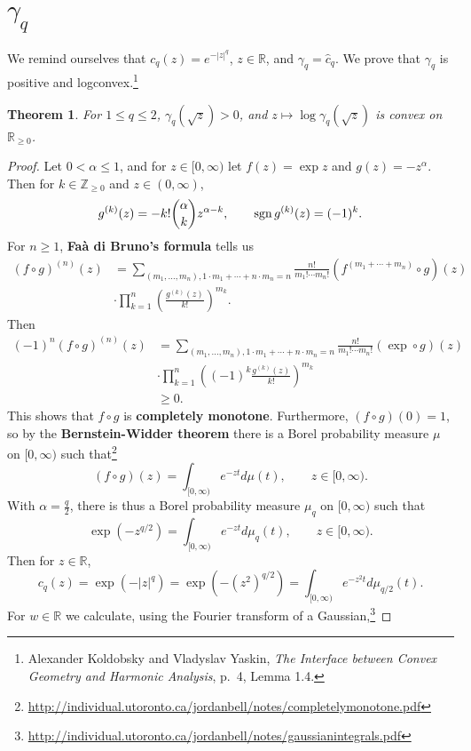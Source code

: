 \documentclass{article}
\newcommand{\sgn}{\ensuremath\mathrm{sgn}\,}
\newtheorem{theorem}{Theorem}
\theoremstyle{definition}
\begin{document}
\section{$\gamma_q$}
We remind ourselves that
$c_q(z) = e^{-|z|^q}$, $z \in \mathbb{R}$, 
and  $\gamma_q = \widehat{c}_q$.
We prove that $\gamma_q$ is positive and logconvex.\footnote{Alexander Koldobsky and
Vladyslav Yaskin, {\em The Interface between Convex Geometry and Harmonic Analysis},
p.~4, Lemma 1.4.}

\begin{theorem}
For $1 \leq q \leq 2$, $\gamma_q (\sqrt{z}) > 0$, and
$z \mapsto \log \gamma_q (\sqrt{z})$
is convex on $\mathbb{R}_{\geq 0}$.  
\end{theorem}
\begin{proof}
Let $0<\alpha \leq 1$, and for $z \in [0,\infty)$ let
 $f(z) = \exp z$ and $g(z) = -z^\alpha$. Then for $k \in \mathbb{Z}_{\geq 0}$ and
$z \in (0,\infty)$,
\[
g^{(k)}(z) = -k! \binom{\alpha}{k} z^{\alpha-k},
\qquad \sgn g^{(k)}(z) = (-1)^k.
\]
For $n \geq 1$,
\textbf{Fa\`a di Bruno's formula} tells us
\begin{align*}
(f \circ g)^{(n)}(z) &= \sum_{(m_1,\ldots,m_n), 1\cdot m_1+\cdots+n \cdot m_n=n} \frac{n!}{m_1! \cdots m_n!} (f^{(m_1+\cdots+m_n)} 
\circ g)(z)\\
& \cdot \prod_{k=1}^n \left( \frac{g^{(k)}(z)}{k!} \right)^{m_k}.
\end{align*}
Then 
\begin{align*}
(-1)^n (f \circ g)^{(n)}(z) &= \sum_{(m_1,\ldots,m_n), 1\cdot m_1+\cdots+n \cdot m_n=n} \frac{n!}{m_1! \cdots m_n!} 
(\exp \circ g)(z)\\
&\cdot  \prod_{k=1}^n \left( (-1)^k \frac{ g^{(k)}(z)}{k!} \right)^{m_k}\\
&\geq 0.
\end{align*}
This shows that $f \circ g$ is \textbf{completely monotone}. Furthermore,
$(f \circ g)(0) = 1$, so by the \textbf{Bernstein-Widder theorem}
there is a Borel probability measure $\mu$ on $[0,\infty)$ such that\footnote{\url{http://individual.utoronto.ca/jordanbell/notes/completelymonotone.pdf}}
\[
(f \circ g)(z) = \int_{[0,\infty)} e^{-zt} d\mu(t),\qquad z \in [0,\infty).
\]
With $\alpha= \frac{q}{2}$, there is thus a Borel probability measure $\mu_q$ on $[0,\infty)$ 
such that
\[
\exp(-z^{q/2}) = \int_{[0,\infty)} e^{-zt} d\mu_q(t),\qquad z \in [0,\infty).
\]
Then for $z \in \mathbb{R}$,
\[
c_q(z) = \exp(-|z|^q) = \exp(- (z^2)^{q/2}) =   \int_{[0,\infty)} e^{-z^2 t} d\mu_{q/2}(t).
\]
For $w \in \mathbb{R}$ we calculate, using the Fourier transform of a Gaussian,\footnote{\url{http://individual.utoronto.ca/jordanbell/notes/gaussianintegrals.pdf}}

\end{proof}
\end{document}
